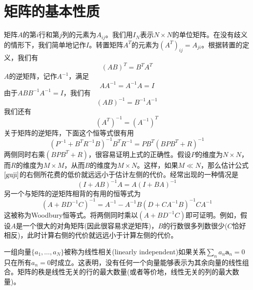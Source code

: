\section{矩阵的基本性质}
矩阵$A$的第$i$行和第$j$列的元素为$A_{ij}$。我们用$I_N$表示$N\times N$的单位矩阵。在没有歧义的情形下，我们简单地记作$I$。转置矩阵$A^T$的元素为$(A^T)_{ij}=A_{ji}$。根据转置的定义，我们有
\begin{equation}
	(AB)^T=B^TA^T
\end{equation}
$A$的逆矩阵，记作$A^{-1}$，满足
\begin{equation}
	AA^{-1}=A^{-1}A=I
\end{equation}
由于$ABB^{-1}A^{-1}=I$，我们有
\begin{equation}
\label{c3}
	(AB)^{-1}=B^{-1}A^{-1}
\end{equation}
我们还有
\begin{equation}
	(A^T)^{-1}=(A^{-1})^T
\end{equation}
关于矩阵的逆矩阵，下面这个恒等式很有用
\begin{equation}
\label{guji}
	(P^{-1}+B^TR^{-1}B)^{-1}B^TR^{-1}=PB^T(BPB^T+R)^{-1}
\end{equation}
两侧同时右乘$(BPB^T+R)$，很容易证明上式的正确性。假设$P$的维度为$N\times N$，而$R$的维度为$M\times M$，从而$B$的维度为$M\times N$。这样，如果$M\ll N$，那么估计公式$\ref{guji}$的右侧所花费的低价就远远小于估计左侧的代价。经常出现的一种情况是
\begin{equation}
	(I+AB)^{-1}A=A(I+BA)^{-1}
\end{equation}
另一个与矩阵的逆矩阵相背的有用的恒等式为
\begin{equation}
	(A+BD^{-1}C)^{-1}=A^{-1}-A^{-1}B(D+CA^{-1}B)^{-1}CA^{-1}
\end{equation}
这被称为Woodbury恒等式。将两侧同时乘以$(A+BD^{-1}C)$即可证明。例如，假设$A$是一个很大的对角矩阵(因此很容易求逆矩阵)，$B$的行数很多列数很少($C$恰好相反)，此时计算右侧的代价就远远小于计算左侧的代价。

一组向量$\{a_1,\dots,a_N\}$被称为线性相关(linearly independent)如果关系$\sum_n a_n \boldsymbol{a}_n=0$只在所有$a_n=0$时成立。这表明，没有任何一个向量能够表示为其余向量的线性组合。矩阵的秩是线性无关的行的最大数量(或者等价地，线性无关的列的最大数量)。
